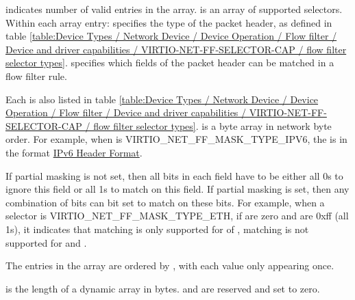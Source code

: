  indicates number of valid entries in the  array.
 is an array of supported selectors. Within each array entry:
 specifies the type of the packet header, as defined in table
\ref{table:Device Types / Network Device / Device Operation / Flow filter / Device and driver capabilities / VIRTIO-NET-FF-SELECTOR-CAP / flow filter selector types}.  specifies which fields of the
packet header can be matched in a flow filter rule.

Each  is also listed in table
\ref{table:Device Types / Network Device / Device Operation / Flow filter / Device and driver capabilities / VIRTIO-NET-FF-SELECTOR-CAP / flow filter selector types}.  is a byte array
in network byte order. For example, when  is VIRTIO_NET_FF_MASK_TYPE_IPV6,
the  is in the format \hyperref[intro:IPv6-Header-Format]{IPv6 Header Format}.

If partial masking is not set, then all bits in each field have to be either all 0s
to ignore this field or all 1s to match on this field. If partial masking is set,
then any combination of bits can bit set to match on these bits.
For example, when a selector  is VIRTIO_NET_FF_MASK_TYPE_ETH, if
 are zero and  are 0xff (all 1s), it
indicates that matching is only supported for  of
, matching is not supported for
 and .

The entries in the array  are ordered by
, with each  value only appearing once.

 is the length of a dynamic array  in bytes.
 and  are reserved and set to zero.

